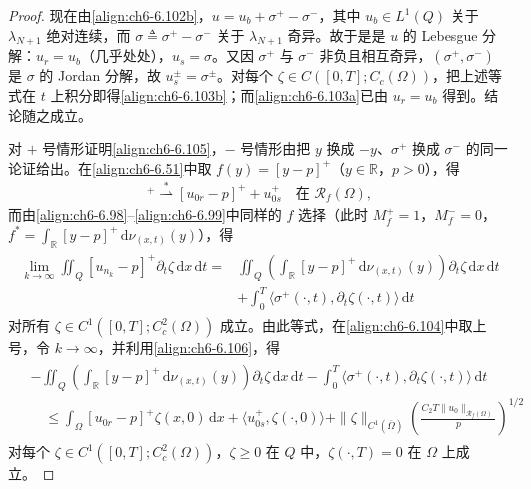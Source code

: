 \documentclass[../../main.tex]{subfiles}%
\begin{document}
\begin{proof}
现在由\eqref{align:ch6-6.102b}，$u=u_b+\sigma^+-\sigma^-$，其中 $u_b\in L^1(Q)$ 关于 $\lambda_{N+1}$ 绝对连续，而 $\sigma\triangleq\sigma^+-\sigma^-$ 关于 $\lambda_{N+1}$ 奇异。故于是是 $u$ 的 Lebesgue 分解：$u_r=u_b$（几乎处处），$u_s=\sigma$。又因 $\sigma^+$ 与 $\sigma^-$ 非负且相互奇异，$(\sigma^+,\sigma^-)$ 是 $\sigma$ 的 Jordan 分解，故 $u^\pm_s=\sigma^\pm$。对每个 $\zeta\in C([0,T];C_c(\Omega))$，把上述等式在 $t$ 上积分即得\eqref{align:ch6-6.103b}；而\eqref{align:ch6-6.103a}已由 $u_r=u_b$ 得到。结论随之成立。

对 $+$ 号情形证明\eqref{align:ch6-6.105}，$-$ 号情形由把 $y$ 换成 $-y$、$\sigma^+$ 换成 $\sigma^-$ 的同一论证给出。在\eqref{align:ch6-6.51}中取 $f(y)=[y-p]^+$（$y\in\mathbb{R}$，$p>0$），得
\begin{align}
[u_{0n_k}-p]^+\stackrel{*}{\rightharpoonup}[u_{0r}-p]^++u^+_{0s}
\quad\text{在 }\mathscr{R}_f(\Omega), \label{align:ch6-6.106}
\end{align}
而由\eqref{align:ch6-6.98}--\eqref{align:ch6-6.99}中同样的 $f$ 选择（此时 $M^+_f=1$，$M^-_f=0$，$f^*=\int_\mathbb{R}[y-p]^+\,\mathrm{d}\nu_{(x,t)}(y)$），得
\begin{align*}
\begin{aligned}
\lim_{k\to\infty}\iint_Q[u_{n_k}-p]^+\partial_t\zeta\,\mathrm{d}x\,\mathrm{d}t
={}&\iint_Q\left(\int_\mathbb{R}[y-p]^+\,\mathrm{d}\nu_{(x,t)}(y)\right)\partial_t\zeta\,\mathrm{d}x\,\mathrm{d}t\\
&+\int_0^T\langle\sigma^+(\cdot,t),\partial_t\zeta(\cdot,t)\rangle\,\mathrm{d}t
\end{aligned}
\end{align*}
对所有 $\zeta\in C^1([0,T];C^2_c(\Omega))$ 成立。由此等式，在\eqref{align:ch6-6.104}中取上号，令 $k\to\infty$，并利用\eqref{align:ch6-6.106}，得
\begin{align}
\begin{aligned}
&-\iint_Q\left(\int_\mathbb{R}[y-p]^+\,\mathrm{d}\nu_{(x,t)}(y)\right)\partial_t\zeta\,\mathrm{d}x\,\mathrm{d}t
-\int_0^T\langle\sigma^+(\cdot,t),\partial_t\zeta(\cdot,t)\rangle\,\mathrm{d}t\\
&\quad\leqslant\int_\Omega[u_{0r}-p]^+\zeta(x,0)\,\mathrm{d}x
+\langle u^+_{0s},\zeta(\cdot,0)\rangle
+\|\zeta\|_{C^1(\overline\Omega)}\left(\frac{C_2T\|u_0\|_{\mathscr{R}_f(\Omega)}}{p}\right)^{1/2}
\end{aligned} 
\label{align:ch6-6.107}
\end{align}
对每个 $\zeta\in C^1([0,T];C^2_c(\Omega))$，$\zeta\geqslant0$ 在 $Q$ 中，$\zeta(\cdot,T)=0$ 在 $\Omega$ 上成立。


\end{proof}
\end{document}

